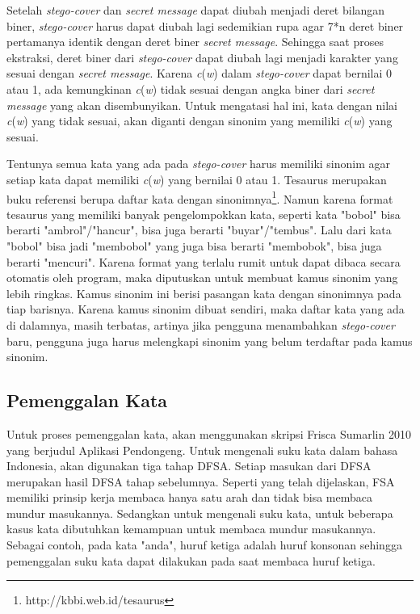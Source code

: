 Setelah \textit{stego-cover} dan \textit{secret message} dapat diubah menjadi deret bilangan biner, \textit{stego-cover} harus dapat diubah lagi sedemikian rupa agar 7*n deret biner pertamanya identik dengan deret biner \textit{secret message}. Sehingga saat proses ekstraksi, deret biner dari \textit{stego-cover} dapat diubah lagi menjadi karakter yang sesuai dengan \textit{secret message}. Karena \textit{c}(\textit{w}) dalam \textit{stego-cover} dapat bernilai 0 atau 1, ada kemungkinan \textit{c}(\textit{w}) tidak sesuai dengan angka biner dari \textit{secret message} yang akan disembunyikan. Untuk mengatasi hal ini, kata dengan nilai \textit{c}(\textit{w}) yang tidak sesuai, akan diganti dengan sinonim yang memiliki \textit{c}(\textit{w}) yang sesuai.

Tentunya semua kata yang ada pada \textit{stego-cover} harus memiliki sinonim agar setiap kata dapat memiliki \textit{c}(\textit{w}) yang bernilai 0 atau 1. Tesaurus merupakan buku referensi berupa daftar kata dengan sinonimnya\footnote{http://kbbi.web.id/tesaurus}. Namun karena format tesaurus yang memiliki banyak pengelompokkan kata, seperti kata "bobol" bisa berarti "ambrol"/"hancur", bisa juga berarti "buyar"/"tembus". Lalu dari kata "bobol" bisa jadi "membobol" yang juga bisa berarti "membobok", bisa juga berarti "mencuri". Karena format yang terlalu rumit untuk dapat dibaca secara otomatis oleh program, maka diputuskan untuk membuat kamus sinonim yang lebih ringkas. Kamus sinonim ini berisi pasangan kata dengan sinonimnya pada tiap barisnya. Karena kamus sinonim dibuat sendiri, maka daftar kata yang ada di dalamnya, masih terbatas, artinya jika pengguna menambahkan \textit{stego-cover} baru, pengguna juga harus melengkapi sinonim yang belum terdaftar pada kamus sinonim.

\subsection{Pemenggalan Kata}
Untuk proses pemenggalan kata, akan menggunakan skripsi Frisca Sumarlin 2010 yang berjudul Aplikasi Pendongeng. Untuk mengenali suku kata dalam bahasa Indonesia, akan digunakan tiga tahap DFSA. Setiap masukan dari DFSA merupakan hasil DFSA tahap sebelumnya. Seperti yang telah dijelaskan, FSA memiliki prinsip kerja membaca hanya satu arah dan tidak bisa membaca mundur masukannya. Sedangkan untuk mengenali suku kata, untuk beberapa kasus kata dibutuhkan kemampuan untuk membaca mundur masukannya. Sebagai contoh, pada kata "anda", huruf ketiga adalah huruf konsonan sehingga pemenggalan suku kata dapat dilakukan pada saat membaca huruf ketiga.

